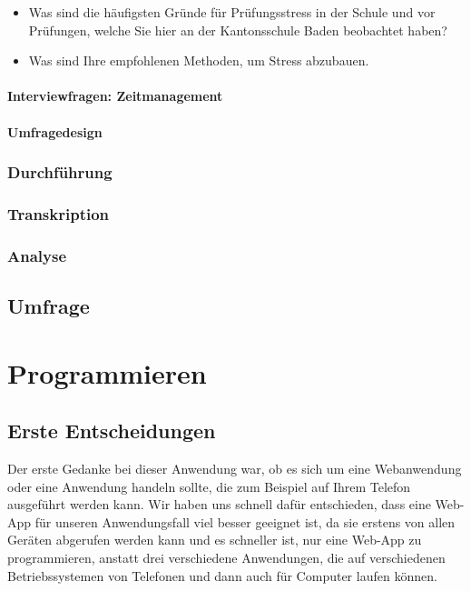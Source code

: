 \documentclass[12pt,a4paper]{report}
\begin{document}
\begin{itemize}
    \item Was sind die häufigsten Gründe für Prüfungsstress in der Schule und vor Prüfungen, welche Sie hier an der Kantonsschule Baden beobachtet haben?
    \item Was sind Ihre empfohlenen Methoden, um Stress abzubauen.
\end{itemize}
\subsubsection{Interviewfragen: Zeitmanagement}
\subsubsection{Umfragedesign}

\subsection {Durchführung}

\subsection {Transkription}

\subsection {Analyse}

\section{Umfrage}


\chapter{Programmieren}
\section{Erste Entscheidungen}
Der erste Gedanke bei dieser Anwendung war, ob es sich um eine Webanwendung oder eine Anwendung handeln sollte, die zum Beispiel auf Ihrem Telefon ausgeführt werden kann. Wir haben uns schnell dafür entschieden, dass eine Web-App für unseren Anwendungsfall viel besser geeignet ist, da sie erstens von allen Geräten abgerufen werden kann und es schneller ist, nur eine Web-App zu programmieren, anstatt drei verschiedene Anwendungen, die auf verschiedenen Betriebssystemen von Telefonen und dann auch für Computer laufen können.
\end{document}
